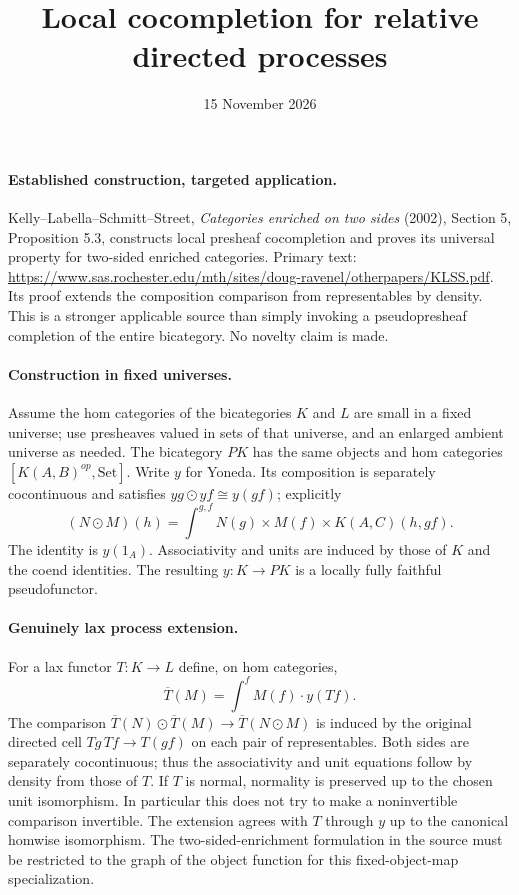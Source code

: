 \documentclass{article}
\title{Local cocompletion for relative directed processes}
\date{15 November 2026}
\begin{document}
\maketitle
\paragraph{Established construction, targeted application.} Kelly--Labella--Schmitt--Street, \emph{Categories enriched on two sides} (2002), Section 5, Proposition 5.3, constructs local presheaf cocompletion and proves its universal property for two-sided enriched categories. Primary text: \url{https://www.sas.rochester.edu/mth/sites/doug-ravenel/otherpapers/KLSS.pdf}. Its proof extends the composition comparison from representables by density. This is a stronger applicable source than simply invoking a pseudopresheaf completion of the entire bicategory. No novelty claim is made.

\paragraph{Construction in fixed universes.} Assume the hom categories of the bicategories $K$ and $L$ are small in a fixed universe; use presheaves valued in sets of that universe, and an enlarged ambient universe as needed. The bicategory $PK$ has the same objects and hom categories $[K(A,B)^{op},\mathrm{Set}]$. Write $y$ for Yoneda. Its composition is separately cocontinuous and satisfies $yg\odot yf\cong y(gf)$; explicitly
\[
 (N\odot M)(h)=\int^{g,f}N(g)\times M(f)\times K(A,C)(h,gf).
\]
The identity is $y(1_A)$. Associativity and units are induced by those of $K$ and the coend identities. The resulting $y:K\to PK$ is a locally fully faithful pseudofunctor.

\paragraph{Genuinely lax process extension.} For a lax functor $T:K\to L$ define, on hom categories,
\[
 \overline T(M)=\int^f M(f)\cdot y(Tf).
\]
The comparison $\overline T(N)\odot\overline T(M)\to\overline T(N\odot M)$ is induced by the original directed cell $Tg\,Tf\to T(gf)$ on each pair of representables. Both sides are separately cocontinuous; thus the associativity and unit equations follow by density from those of $T$. If $T$ is normal, normality is preserved up to the chosen unit isomorphism. In particular this does not try to make a noninvertible comparison invertible. The extension agrees with $T$ through $y$ up to the canonical homwise isomorphism. The two-sided-enrichment formulation in the source must be restricted to the graph of the object function for this fixed-object-map specialization.
\end{document}
